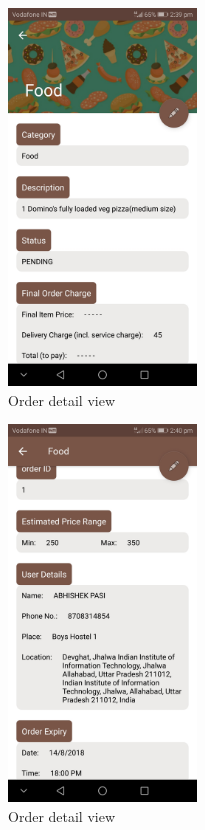 \documentclass{report}
\begin{document}
\begin{figure}[h!]
\begin{subfigure}[b]{.3\textwidth}
\centering
\includegraphics[width=5cm]{order_detail1.jpg}
\caption{\centering \tiny Order detail view}
\end{subfigure}
\begin{subfigure}[b]{.3\textwidth}
\centering
\includegraphics[width=5cm]{order_detail2.jpg}
\caption{\centering \tiny Order detail view}
\end{subfigure}
\begin{subfigure}[b]{.3\textwidth}
\centering

\end{subfigure}
\end{figure}
\end{document}
